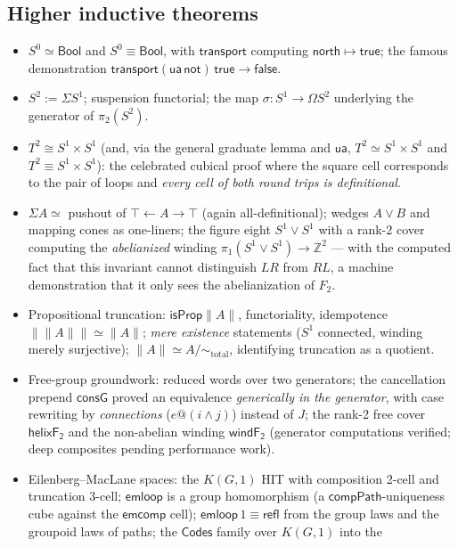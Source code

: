 \documentclass[11pt]{article}
\newcommand{\Z}{\mathbb{Z}}
\newcommand{\op}[1]{\ensuremath{\mathsf{#1}}}
\begin{document}
\subsection{Higher inductive theorems}
\begin{itemize}[leftmargin=1.5em]
\item $S^0\simeq\op{Bool}$ and $S^0\equiv\op{Bool}$, with
$\op{transport}$ computing $\op{north}\mapsto\op{true}$; the famous
demonstration $\op{transport}(\op{ua}\,\op{not})\,\op{true}
\longrightarrow \op{false}$.
\item $S^2:=\Sigma S^1$; suspension functorial; the map
$\sigma:S^1\to\Omega S^2$ underlying the generator of $\pi_2(S^2)$.
\item $T^2\cong S^1\times S^1$ (and, via the general graduate lemma and
$\op{ua}$, $T^2\simeq S^1\times S^1$ and $T^2\equiv S^1\times S^1$):
the celebrated cubical proof where the square cell corresponds to the
pair of loops and \emph{every cell of both round trips is definitional}.
\item $\Sigma A\simeq$ pushout of $\top\leftarrow A\rightarrow\top$
(again all-definitional); wedges $A\vee B$ and mapping cones as
one-liners; the figure eight $S^1\vee S^1$ with a rank-2 cover computing
the \emph{abelianized} winding $\pi_1(S^1{\vee}S^1)\to\Z^2$ --- with the
computed fact that this invariant cannot distinguish $LR$ from $RL$,
a machine demonstration that it only sees the abelianization of $F_2$.
\item Propositional truncation: $\op{isProp}\lVert A\rVert$,
functoriality, idempotence $\lVert\lVert A\rVert\rVert\simeq\lVert
A\rVert$; \emph{mere existence} statements ($S^1$ connected, winding
merely surjective); $\lVert A\rVert\simeq A/\!\sim_{\mathrm{total}}$,
identifying truncation as a quotient.
\item Free-group groundwork: reduced words over two generators; the
cancellation prepend $\op{consG}$ proved an equivalence \emph{generically
in the generator}, with case rewriting by \emph{connections}
($e@(i\wedge j)$) instead of $J$; the rank-2 free cover
$\op{helixF_2}$ and the non-abelian winding $\op{windF_2}$ (generator
computations verified; deep composites pending performance work).
\item Eilenberg--MacLane spaces: the $K(G,1)$ HIT with composition
2-cell and truncation 3-cell; $\op{emloop}$ is a group homomorphism (a
$\op{compPath}$-uniqueness cube against the $\op{emcomp}$ cell);
$\op{emloop}\,1\equiv\op{refl}$ from the group laws and the groupoid
laws of paths; the $\op{Codes}$ family over $K(G,1)$ into the

\end{itemize}
\end{document}
